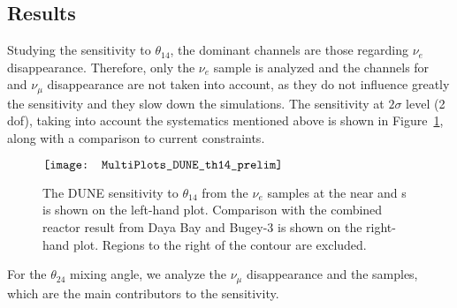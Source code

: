 \subsection{Results}
Studying the sensitivity to $\theta_{14}$, the dominant channels are those regarding $\nu_e$ disappearance. Therefore, only the $\nu_e$  sample is analyzed and the channels for  and $\nu_{\mu}$  disappearance are not taken into account, as they do not influence greatly the sensitivity and they slow down the simulations. The sensitivity at $2\sigma$ level (2 dof), taking into account the systematics mentioned above is shown in Figure~\ref{th_14}, along with a comparison to current constraints.
\begin{figure}
\centering
$\vcenter{\hbox{\texttt{[image: MultiPlots\_DUNE\_th14\_prelim]}}}$
\caption[Sensitivity to $\theta_{14}$ from the $\nu_e$  samples at near and s]{The DUNE sensitivity to $\theta_{14}$ from the $\nu_e$  samples at the near and s is shown on the left-hand plot. Comparison with the combined reactor result from Daya Bay and Bugey-3 is shown on the right-hand plot. Regions to the right of the contour are excluded.}
\label{th_14}
\end{figure}

For the $\theta_{24}$ mixing angle, we analyze the $\nu_{\mu}$  disappearance and the  samples, which are the main contributors to the sensitivity. 

